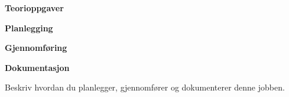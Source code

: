\vskip 10pt 
\textbf{Teorioppgaver}

\vskip 5pt 

\vskip 10pt 
\textbf{Planlegging}


\vskip 10pt 
\textbf{Gjennomføring}

\vskip 10pt 
\textbf{Dokumentasjon}

Beskriv hvordan du planlegger, gjennomfører og dokumenterer denne jobben. 




















\vfil \eject

















